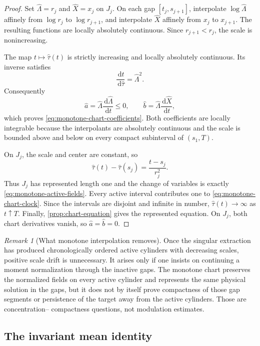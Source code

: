 \documentclass[11pt]{amsart}
\numberwithin{equation}{section}
\theoremstyle{plain}
\theoremstyle{definition}
\theoremstyle{remark}
\newtheorem{remark}[remark]{Remark}
\newcommand{\dd}{\,\mathrm d}
\begin{document}
\begin{proof}
Set \(\widehat\Lambda=r_j\) and \(\widehat X=x_j\) on \(J_j\).
On each gap \([t_j,s_{j+1}]\), interpolate
\(\log\widehat\Lambda\) affinely from \(\log r_j\) to
\(\log r_{j+1}\), and interpolate \(\widehat X\) affinely from
\(x_j\) to \(x_{j+1}\).  The resulting functions are locally absolutely
continuous.  Since \(r_{j+1}<r_j\), the scale is nonincreasing.

The map \(t\mapsto\widehat\tau(t)\) is strictly increasing and locally
absolutely continuous.  Its inverse satisfies
\[
 \frac{\dd t}{\dd\widehat\tau}=\widehat\Lambda^2.
\]
Consequently
\[
 \widehat a
 =\widehat\Lambda\frac{\dd\widehat\Lambda}{\dd t}\le0,
 \qquad
 \widehat b
 =\widehat\Lambda\frac{\dd\widehat X}{\dd t},
\]
which proves \eqref{eq:monotone-chart-coefficients}.  Both coefficients are
locally integrable because the interpolants are absolutely continuous and
the scale is bounded above and below on every compact subinterval of
\((s_1,T)\).

On \(J_j\), the scale and center are constant, so
\[
 \widehat\tau(t)-\widehat\tau(s_j)
 =\frac{t-s_j}{r_j^2}.
\]
Thus \(J_j\) has represented length one and the change of variables is
exactly \eqref{eq:monotone-active-fields}.  Every active interval contributes
one to \eqref{eq:monotone-chart-clock}.  Since the intervals are disjoint and
infinite in number, \(\widehat\tau(t)\to\infty\) as \(t\uparrow T\).
Finally, \cref{prop:chart-equation} gives the represented equation.  On
\(J_j\), both chart derivatives vanish, so \(\widehat a=\widehat b=0\).
\end{proof}

\begin{remark}[What monotone interpolation removes]
\label{rem:monotone-interpolation-scope}
Once the singular extraction has produced chronologically ordered active
cylinders with decreasing scales, positive scale drift is unnecessary.  It
arises only if one insists on continuing a moment normalization through the
inactive gaps.  The monotone chart preserves the normalized fields on every
active cylinder and represents the same physical solution in the gaps, but
it does not by itself prove compactness of those gap segments or persistence
of the target away from the active cylinders.  Those are concentration--
compactness questions, not modulation estimates.
\end{remark}

\subsection{The invariant mean identity}
\end{document}
